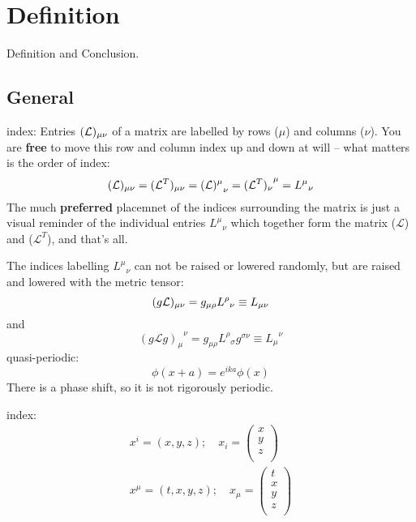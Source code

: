 \chapter{Definition}
Definition and Conclusion.

\section{General}

index:                                                          
Entries $(\mathcal{L})_{\mu\nu}$ of a matrix are labelled by rows ($\mu$) and columns ($\nu$).
You are \textbf{free} to move this row and column index up and down at will --
what matters is the order of index:
\[
    (\mathcal{L})_{\mu\nu} = (\mathcal{L}^T)_{\mu\nu} = {(\mathcal{L})^\mu}_\nu = {(\mathcal{L}^T)_\nu}^\mu = {L^\mu}_\nu
    \]
The much \textbf{preferred} placemnet of the indices surrounding the matrix is just a 
visual reminder of the individual entries ${L^\mu}_\nu$ which together form the matrix ($\mathcal{L}$) 
and ($\mathcal{L}^T$), and that's all.

The indices labelling ${L^\mu}_\nu$ can not be raised or lowered randomly,
but are raised and lowered with the metric tensor:
\[
    (g\mathcal{L})_{\mu\nu} = g_{\mu\rho}{L^\rho}_{\nu} \equiv L_{\mu\nu} 
    \]
and 
\[
    {(g\mathcal{L}g)_\mu}^\nu = g_{\mu\rho}{L^\rho}_\sigma g^{\sigma\nu} \equiv {L_\mu}^\nu
    \]
quasi-periodic:
\begin{equation}
    \label{quasi-periodic}
    \phi(x+a) = e^{ika}\phi(x)
\end{equation}
There is a phase shift, so it is not rigorously periodic.

index:
\begin{equation}
    \begin{gathered}
	x^i = (x, y, z); \quad 
	x_i = 
	\begin{pmatrix}
	    x   \\
	    y   \\
	    z   \\
	\end{pmatrix}   \\
	x^\mu = (t, x, y, z); \quad 
	x_\mu = 
	\begin{pmatrix}
	    t	\\
	    x   \\
	    y   \\
	    z   \\
	\end{pmatrix}   \\
    \end{gathered}
\end{equation}

